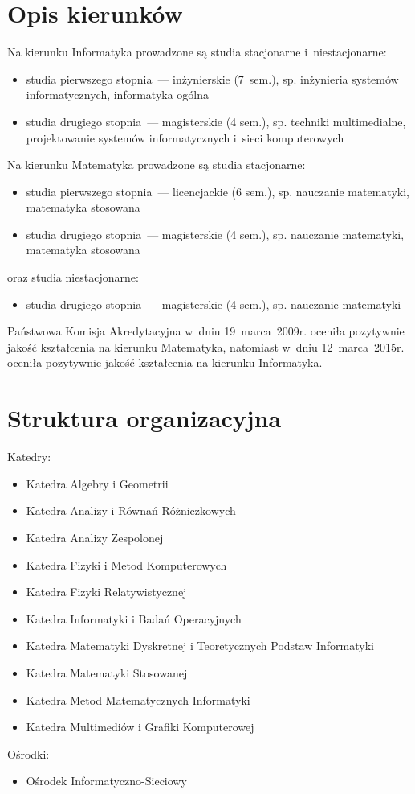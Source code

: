 \documentclass[a4paper,12pt]{article}
\begin{document}
\section{Opis kierunków}
Na kierunku Informatyka prowadzone są studia stacjonarne i~niestacjonarne:
\begin{itemize}
\item{studia pierwszego stopnia~--- inżynierskie (7~sem.), sp. inżynieria systemów informatycznych, informatyka ogólna}
\item{studia drugiego stopnia~--- magisterskie (4 sem.), sp. techniki multimedialne, projektowanie systemów informatycznych i~sieci komputerowych}
\end{itemize}
Na kierunku Matematyka prowadzone są studia stacjonarne:
\begin{itemize}
\item{studia pierwszego stopnia~--- licencjackie (6 sem.), sp. nauczanie matematyki, matematyka stosowana}
\item{studia drugiego stopnia~--- magisterskie (4 sem.), sp. nauczanie matematyki, matematyka stosowana}
\end{itemize}
oraz studia niestacjonarne:
\begin{itemize}
\item{studia drugiego stopnia~--- magisterskie (4 sem.), sp. nauczanie matematyki}
\end{itemize}
Państwowa Komisja Akredytacyjna w~dniu 19~marca~2009r. oceniła pozytywnie jakość kształcenia na kierunku Matematyka, natomiast w~dniu 12~marca~2015r. oceniła pozytywnie jakość kształcenia na kierunku Informatyka.

\section{Struktura organizacyjna}
Katedry:
\begin{itemize}
\item{Katedra Algebry i Geometrii}
\item{Katedra Analizy i Równań Różniczkowych}
\item{Katedra Analizy Zespolonej}
\item{Katedra Fizyki i Metod Komputerowych}
\item{Katedra Fizyki Relatywistycznej}
\item{Katedra Informatyki i Badań Operacyjnych}
\item{Katedra Matematyki Dyskretnej i Teoretycznych Podstaw Informatyki}
\item{Katedra Matematyki Stosowanej}
\item{Katedra Metod Matematycznych Informatyki}
\item{Katedra Multimediów i Grafiki Komputerowej}
\end{itemize}
Ośrodki:
\begin{itemize}
\item{Ośrodek Informatyczno-Sieciowy}
\end{itemize}
\end{document}
